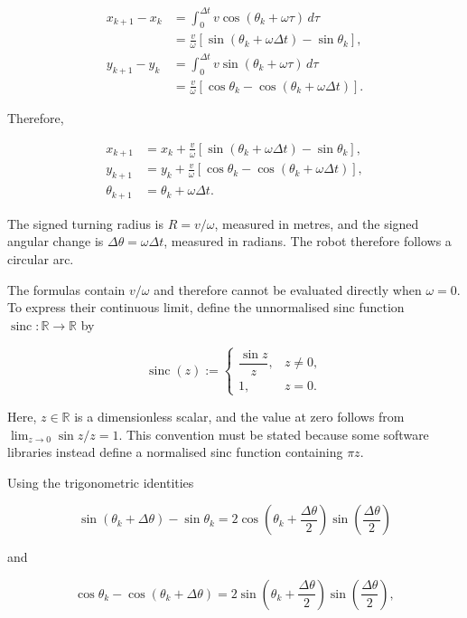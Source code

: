 \documentclass[
  australian,
  12pt,
  letterpaper,
  DIV=11,
  numbers=noendperiod,
  twoside]{scrreprt}
\begin{document}
\[
\begin{aligned}
x_{k+1}-x_k
&=\int_0^{\Delta t}v\cos(\theta_k+\omega\tau)\,d\tau\\
&=\frac{v}{\omega}\left[\sin(\theta_k+\omega\Delta t)-\sin\theta_k\right],\\[4pt]
y_{k+1}-y_k
&=\int_0^{\Delta t}v\sin(\theta_k+\omega\tau)\,d\tau\\
&=\frac{v}{\omega}\left[\cos\theta_k-\cos(\theta_k+\omega\Delta t)\right].
\end{aligned}
\]

Therefore,

\[
\boxed{
\begin{aligned}
x_{k+1}&=x_k+\frac{v}{\omega}\left[\sin(\theta_k+\omega\Delta t)-\sin\theta_k\right],\\
y_{k+1}&=y_k+\frac{v}{\omega}\left[\cos\theta_k-\cos(\theta_k+\omega\Delta t)\right],\\
\theta_{k+1}&=\theta_k+\omega\Delta t.
\end{aligned}
}
\]

The signed turning radius is \(R=v/\omega\), measured in metres, and the
signed angular change is \(\Delta\theta=\omega\Delta t\), measured in
radians. The robot therefore follows a circular arc.

The formulas contain \(v/\omega\) and therefore cannot be evaluated
directly when \(\omega=0\). To express their continuous limit, define
the unnormalised sinc function
\(\operatorname{sinc}:\mathbb R\to\mathbb R\) by

\[
\operatorname{sinc}(z)
\mathrel{:=}
\begin{cases}
\dfrac{\sin z}{z},&z\neq0,\\[6pt]
1,&z=0.
\end{cases}
\]

Here, \(z\in\mathbb R\) is a dimensionless scalar, and the value at zero
follows from \(\lim_{z\to0}\sin z/z=1\). This convention must be stated
because some software libraries instead define a normalised sinc
function containing \(\pi z\).

Using the trigonometric identities

\[
\sin(\theta_k+\Delta\theta)-\sin\theta_k
=
2\cos\left(\theta_k+\frac{\Delta\theta}{2}\right)
\sin\left(\frac{\Delta\theta}{2}\right)
\]

and

\[
\cos\theta_k-\cos(\theta_k+\Delta\theta)
=
2\sin\left(\theta_k+\frac{\Delta\theta}{2}\right)
\sin\left(\frac{\Delta\theta}{2}\right),
\]
\end{document}
